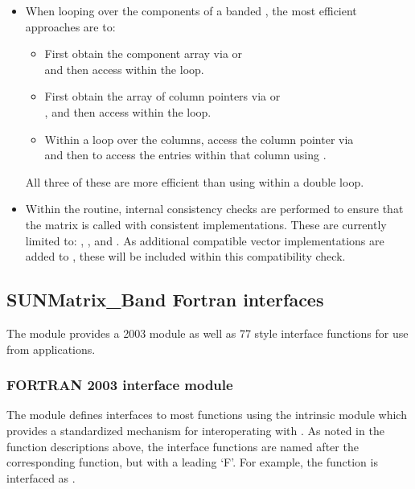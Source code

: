 \begin{itemize}

\item
  When looping over the components of a banded  ,
  the most efficient approaches are to:
  \begin{itemize}
    \item First obtain the component array via  or\\
     and then
    access  within the loop.

    \item First obtain the array of column pointers via  or\\
    , and then
    access  within the loop.

    \item Within a loop over the columns, access the column pointer via\\
     and then to access the
    entries within that column using .
  \end{itemize}
  All three of these are more efficient than
  using  within a double loop.

\item
  {\warn} Within the  routine, internal
  consistency checks are performed to ensure that the matrix is called
  with consistent {\nvector} implementations.  These are currently
  limited to: {\nvecs}, {\nvecopenmp}, and {\nvecpthreads}.  As additional
  compatible vector implementations are added to {\sundials}, these
  will be included within this compatibility check.

\end{itemize}


\subsection{SUNMatrix\_Band Fortran interfaces}
\label{ss:sunmat_band_fortran}

The {\sunmatband} module provides a {\F} 2003 module as well as {\F} 77
style interface functions for use from {\F} applications.

\subsubsection*{FORTRAN 2003 interface module}
The  {\F} module defines interfaces to most
{\sunmatband} {\CC} functions using the intrinsic 
module which provides a standardized mechanism for interoperating with {\CC}. As
noted in the {\CC} function descriptions above, the interface functions are
named after the corresponding {\CC} function, but with a leading `F'. For
example, the function  is interfaced as
.

